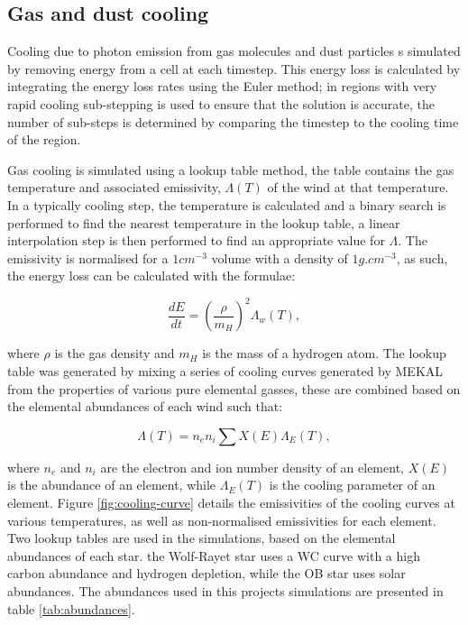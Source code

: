 
\subsection{Gas and dust cooling} \label{sec:gas-dust-cooling}

Cooling due to photon emission from gas molecules and dust particles s simulated by removing energy from a cell at each timestep. This energy loss is calculated by integrating the energy loss rates using the Euler method; in regions with very rapid cooling sub-stepping is used to ensure that the solution is accurate, the number of sub-steps is determined by comparing the timestep to the cooling time of the region.

Gas cooling is simulated using a lookup table method, the table contains the gas temperature and associated emissivity, $\Lambda(T)$ of the wind at that temperature. In a typically cooling step, the temperature is calculated and a binary search is performed to find the nearest temperature in the lookup table, a linear interpolation step is then performed to find an appropriate value for $\Lambda$. The emissivity is normalised for a $1 \si{cm^{-3}}$ volume with a density of $1 \si{g.cm^{-3}}$, as such, the energy loss can be calculated with the formulae:

\begin{equation}
  \frac{dE}{dt} = \left(\frac{\rho}{m_H}\right)^2 \Lambda_w(T),
\end{equation}

where $\rho$ is the gas density and $m_H$ is the mass of a hydrogen atom. The lookup table was generated by mixing a series of cooling curves generated by MEKAL from the properties of various pure elemental gasses, these are combined based on the elemental abundances of each wind such that:

\begin{equation}
  \Lambda(T) = n_e n_i \sum{X(E) \Lambda_{E}(T)},
\end{equation}

where $n_e$ and $n_i$ are the electron and ion number density of an element, $X(E)$ is the abundance of an element, while $\Lambda_E(T)$ is the cooling parameter of an element. Figure \ref{fig:cooling-curve} details the emissivities of the cooling curves at various temperatures, as well as non-normalised emissivities for each element. Two lookup tables are used in the simulations, based on the elemental abundances of each star. the Wolf-Rayet star uses a WC curve with a high carbon abundance and hydrogen depletion, while the OB star uses solar abundances. The abundances used in this projects simulations are presented in table \ref{tab:abundances}.

